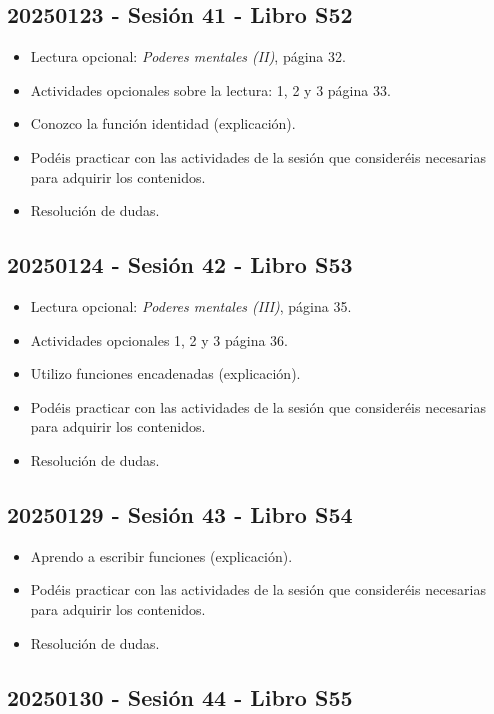 \documentclass[a4paper,12pt]{article}
\begin{document}
\subsection{20250123 - Sesión 41 - Libro S52}

\begin{itemize}
    \item Lectura opcional: \textit{Poderes mentales (II)}, página 32.
    \item Actividades opcionales sobre la lectura: 1, 2 y 3 página 33.
    \item Conozco la función identidad (explicación).
    \item Podéis practicar con las actividades de la sesión que consideréis necesarias para adquirir los contenidos.
    \item Resolución de dudas.
\end{itemize}

\subsection{20250124 - Sesión 42 - Libro S53}

\begin{itemize}
    \item Lectura opcional: \textit{Poderes mentales (III)}, página 35.
    \item Actividades opcionales 1, 2 y 3 página 36.
    \item Utilizo funciones encadenadas (explicación).
    \item Podéis practicar con las actividades de la sesión que consideréis necesarias para adquirir los contenidos.
    \item Resolución de dudas.
\end{itemize}

\subsection{20250129 - Sesión 43 - Libro S54}

\begin{itemize}
    \item Aprendo a escribir funciones (explicación).
    \item Podéis practicar con las actividades de la sesión que consideréis necesarias para adquirir los contenidos.
    \item Resolución de dudas.
\end{itemize}

\subsection{20250130 - Sesión 44 - Libro S55}
\end{document}
